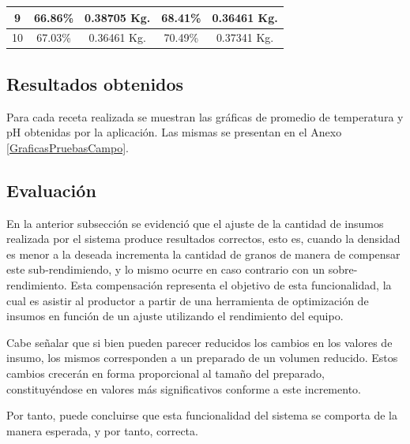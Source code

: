 \begin{minipage}{0.95\textwidth}
\begin{tabularx}{\textwidth}{|X|X|X|X|X|}
             \hline
             \multicolumn{1}{|c|}{9} & \multicolumn{1}{c|}{66.86\%}  & \multicolumn{1}{c|}{0.38705 Kg.} &\multicolumn{1}{c|}{68.41\%} &\multicolumn{1}{c|}{0.36461 Kg.} \\
             \hline
             \multicolumn{1}{|c|}{10} & \multicolumn{1}{c|}{67.03\%} & \multicolumn{1}{c|}{0.36461 Kg.} &\multicolumn{1}{c|}{70.49\%} &\multicolumn{1}{c|}{0.37341 Kg.} \\
             \hline
        \end{tabularx}
        \label{tab:ResultadosPilsenEscalonada}
    \end{minipage}
    
    
    \subsection{Resultados obtenidos}
        \par Para cada receta realizada se muestran las gráficas de promedio de temperatura y pH obtenidas por la aplicación. Las mismas se presentan en el Anexo \ref{GraficasPruebasCampo}.
    
    \subsection{Evaluación}
        \par En la anterior subsección se evidenció que el ajuste de la cantidad de insumos realizada por el sistema produce resultados correctos, esto es, cuando la densidad es menor a la deseada incrementa la cantidad de granos de manera de compensar este sub-rendimiendo, y lo mismo ocurre en caso contrario con un sobre-rendimiento. Esta compensación representa el objetivo de esta funcionalidad, la cual es asistir al productor a partir de una herramienta de optimización de insumos en función de un ajuste utilizando el rendimiento del equipo.
        
        \par Cabe señalar que si bien pueden parecer reducidos los cambios en los valores de insumo, los mismos corresponden a un preparado de un volumen reducido. Estos cambios crecerán en forma proporcional al tamaño del preparado, constituyéndose en valores más significativos conforme a este incremento.
        
        \par Por tanto, puede concluirse que esta funcionalidad del sistema se comporta de la manera esperada, y por tanto, correcta. 
    
    
        
        
